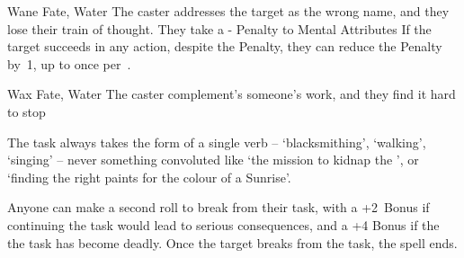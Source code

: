 \ifodd\value{diceNo}

  {}%
  {Wane}%
  {Fate, Water}%
  {}%
  {The caster addresses the target as the wrong name, and they lose their train of thought.
    They take a - Penalty to Mental Attributes}%
  {If the target succeeds in any action, despite the Penalty, they can reduce the Penalty by~1, up to once per~.}

\else

  {}%
  {Wax}%
  {Fate, Water}%
  {}%
  {The caster complement's someone's work, and they find it hard to stop}%
  {The task always takes the form of a single verb -- `blacksmithing', `walking', `singing' -- never something convoluted like `the mission to kidnap the ', or `finding the right paints for the colour of a Sunrise'.

    Anyone can make a second roll to break from their task, with a +2~Bonus if continuing the task  would lead to serious consequences, and a +4 Bonus if the the task has become deadly.
	Once the target breaks from the task, the spell ends.}

\fi
{}

